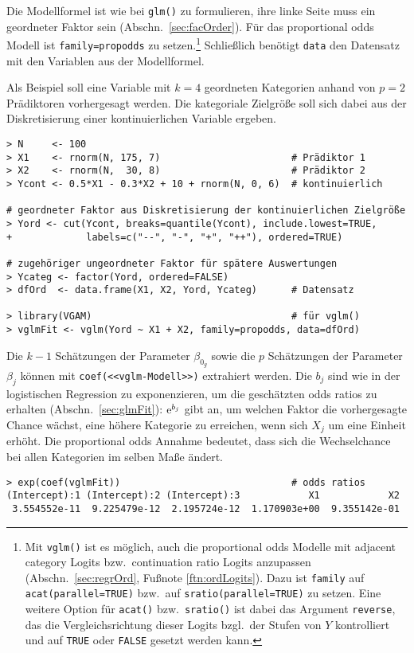 Die Modellformel ist wie bei \lstinline!glm()! zu formulieren, ihre linke Seite muss ein geordneter Faktor sein (Abschn.\ \ref{sec:facOrder}). Für das proportional odds Modell ist \lstinline!family=propodds! zu setzen.\footnote{Mit \lstinline!vglm()! ist es möglich, auch die proportional odds Modelle mit adjacent category Logits bzw.\ continuation ratio Logits anzupassen (Abschn.\ \ref{sec:regrOrd}, Fußnote \ref{ftn:ordLogits}). Dazu ist \lstinline!family! auf \lstinline!acat(parallel=TRUE)! bzw.\ auf \lstinline!sratio(parallel=TRUE)! zu setzen. Eine weitere Option für \lstinline!acat()! bzw.\ \lstinline!sratio()! ist dabei das Argument \lstinline!reverse!, das die Vergleichsrichtung dieser Logits bzgl.\ der Stufen von $Y$ kontrolliert und auf \lstinline!TRUE! oder \lstinline!FALSE! gesetzt werden kann.} Schließlich benötigt \lstinline!data! den Datensatz mit den Variablen aus der Modellformel.

Als Beispiel soll eine Variable mit $k=4$ geordneten Kategorien anhand von $p=2$ Prädiktoren vorhergesagt werden. Die kategoriale Zielgröße soll sich dabei aus der Diskretisierung einer kontinuierlichen Variable ergeben.
\begin{lstlisting}
> N     <- 100
> X1    <- rnorm(N, 175, 7)                       # Prädiktor 1
> X2    <- rnorm(N,  30, 8)                       # Prädiktor 2
> Ycont <- 0.5*X1 - 0.3*X2 + 10 + rnorm(N, 0, 6)  # kontinuierlich

# geordneter Faktor aus Diskretisierung der kontinuierlichen Zielgröße
> Yord <- cut(Ycont, breaks=quantile(Ycont), include.lowest=TRUE,
+             labels=c("--", "-", "+", "++"), ordered=TRUE)

# zugehöriger ungeordneter Faktor für spätere Auswertungen
> Ycateg <- factor(Yord, ordered=FALSE)
> dfOrd  <- data.frame(X1, X2, Yord, Ycateg)      # Datensatz

> library(VGAM)                                   # für vglm()
> vglmFit <- vglm(Yord ~ X1 + X2, family=propodds, data=dfOrd)
\end{lstlisting}

Die $k-1$ Schätzungen der Parameter $\beta_{0_{g}}$ sowie die $p$ Schätzungen der Parameter $\beta_{j}$ können mit \lstinline!coef(<<vglm-Modell>>)! extrahiert werden. Die $b_{j}$ sind wie in der logistischen Regression zu exponenzieren, um die geschätzten odds ratios zu erhalten (Abschn.\ \ref{sec:glmFit}): ${\mathrm{e}}^{b_{j}}$ gibt an, um welchen Faktor die vorhergesagte Chance wächst, eine höhere Kategorie zu erreichen, wenn sich $X_{j}$ um eine Einheit erhöht. Die proportional odds Annahme bedeutet, dass sich die Wechselchance bei allen Kategorien im selben Maße ändert.
\begin{lstlisting}
> exp(coef(vglmFit))                              # odds ratios
(Intercept):1 (Intercept):2 (Intercept):3            X1            X2
 3.554552e-11  9.225479e-12  2.195724e-12  1.170903e+00  9.355142e-01
\end{lstlisting}

